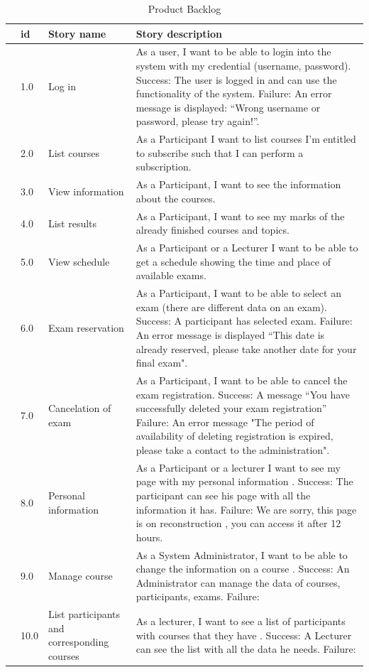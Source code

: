 \documentclass{scrartcl}
\begin{document}
\begin{table}[ht]
    \centering
    \begin{tabular}{c@{\qquad}lll}
        \toprule
           & id & Story name & Story description  \\
        \midrule
        
	
	&1.0 & Log in & As a user, I want to be able to login into the system with my credential (username, password).
 Success: The user is logged in and can use the functionality of the system.
 Failure: An error message is displayed: “Wrong username or password, please try again!”. \\ \hline
	&2.0 & List courses & As a Participant I want to list courses I'm entitled to subscribe such that I can perform a subscription. \\ \hline
	&3.0 & View information & As a Participant, I want to see the information about the courses. \\ \hline
	&4.0 & List results & As a Participant, I want to see my marks of the already finished courses and topics. \\ \hline
	&5.0 & View schedule & As a Participant or a Lecturer I want to be able to get a schedule showing the time and place of available exams. \\ \hline
	&6.0 & Exam reservation & As a Participant, I want to be able to select an exam (there are different data on an exam).
 Success: A participant has selected exam.
 Failure: An error message is displayed “This date is already reserved, please take another date for your final exam". \\ \hline
	&7.0 & Cancelation of exam & As a Participant, I want to be able to cancel the exam registration.
 Success: A message “You have successfully deleted your exam registration”
 Failure: An error message "The period of availability of deleting registration is expired, please take a contact to the administration". \\ \hline
	&8.0 & Personal information & As a Participant or a lecturer I want to see my page with my personal information .
 Success: The participant can see his page with all the information it has.
 Failure: We are sorry, this page is on reconstruction , you can access it after 12 hours. \\ \hline
	&9.0 & Manage course & As a System Administrator, I want to be able to change the information on a course .
 Success: An Administrator can manage the data of courses, participants, exams.
 Failure: \\ \hline
	&10.0 & List participants and corresponding courses & As a lecturer, I want to see a list of participants with courses that they have .
 Success: A Lecturer can see the list with all the data he needs.
 Failure: \\ \hline


        
        \midrule
    \end{tabular}
    \caption{Product Backlog}
    \label{tab:typo}
\end{table}
\end{document}
